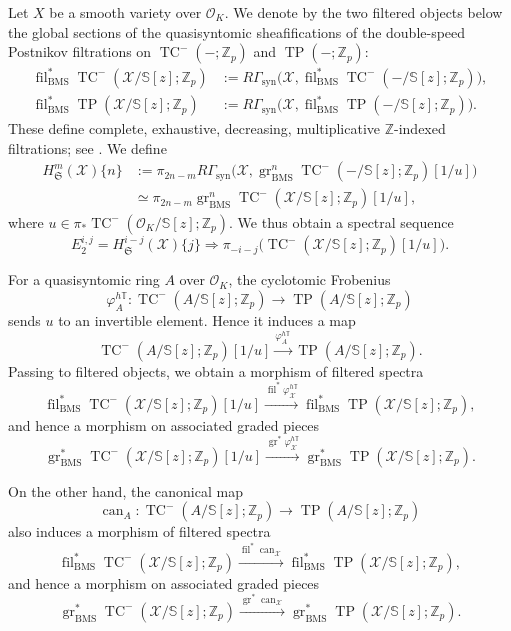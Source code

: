 \documentclass[11pt]{amsart}
\numberwithin{equation}{section}
\newcommand{\Z}{\mathbb{Z}}
\newcommand{\sO}{\mathcal{O}}
\newcommand{\sX}{\mathcal{X}}
\newcommand{\mf}{\mathfrak}
\newcommand{\syn}{{\operatorname{syn}}}
\newcommand{\gr}{{\operatorname{gr}}}
\newcommand{\fil}{{\operatorname{fil}}}
\newcommand{\BMS}{\mathrm{BMS}}
\newcommand{\can}{\operatorname{can}}
\newcommand{\mS}{\mf{S}}
\numberwithin{equation}{section}
\newcommand{\TP}{\operatorname{TP}}
\newcommand{\TCn}{\operatorname{TC}^{-}}
\newcommand{\bS}{\mathbb{S}}
\begin{document}
Let $X$ be a smooth variety over $\sO_K$. We denote by the two filtered objects below the global sections of the quasisyntomic sheafifications of the double-speed Postnikov filtrations on $\TCn(-;\Z_p)$ and $\TP(-;\Z_p)$:
\begin{align*}
\fil_\BMS^*\TCn(\sX/\bS[z];\Z_p)
&:= R\Gamma_{\syn}\bigl(\sX,\fil_\BMS^* \TCn(-/\bS[z];\Z_p)\bigr),\\
\fil_\BMS^*\TP(\sX/\bS[z];\Z_p)
&:= R\Gamma_{\syn}\bigl(\sX,\fil_\BMS^* \TP(-/\bS[z];\Z_p)\bigr).
\end{align*}
These define complete, exhaustive, decreasing, multiplicative $\Z$-indexed filtrations; see \cite[Theorem 1.12]{BMS19}. We define
\begin{align*}
  H^m_{\mS}(\sX)\{n\}
  &:= \pi_{2n-m} R\Gamma_{\syn}\bigl(\sX,\gr_\BMS^{n}\TCn(-/\bS[z];\Z_p)[1/u]\bigr)\\
  &\simeq \pi_{2n-m}\gr_\BMS^{n}\TCn(\sX/\bS[z];\Z_p)[1/u],
\end{align*}
where $u\in \pi_* \TCn(\sO_K/\bS[z];\Z_p)$. We thus obtain a spectral sequence
\begin{equation}\label{bkss}
  E_2^{i,j}=H_{\mS}^{i-j}(\sX)\{j\} \Longrightarrow \pi_{-i-j}\bigl(\TCn(\sX/\bS[z];\Z_p)[1/u]\bigr).
\end{equation}

For a quasisyntomic ring $A$ over $\sO_K$, the cyclotomic Frobenius
\[
  \varphi_A^{h\mathbb{T}}:\TCn(A/\bS[z];\Z_p)\to \TP(A/\bS[z];\Z_p)
\]
sends $u$ to an invertible element. Hence it induces a map
\[
  \TCn(A/\bS[z];\Z_p)[1/u]\overset{\varphi_A^{h\mathbb{T}}}{\longrightarrow}\TP(A/\bS[z];\Z_p).
\]
Passing to filtered objects, we obtain a morphism of filtered spectra
\[
  \fil_{\BMS}^*\TCn(\sX/\bS[z];\Z_p)[1/u]
  \overset{\fil^*\varphi_{\sX}^{h\mathbb{T}}}{\longrightarrow}
  \fil_{\BMS}^*\TP(\sX/\bS[z];\Z_p),
\]
and hence a morphism on associated graded pieces
\[
  \gr_{\BMS}^*\TCn(\sX/\bS[z];\Z_p)[1/u]
  \overset{\gr^*\varphi_{\sX}^{h\mathbb{T}}}{\longrightarrow}
  \gr_{\BMS}^*\TP(\sX/\bS[z];\Z_p).
\]

On the other hand, the canonical map
\[
  \can_A:\TCn(A/\bS[z];\Z_p)\to \TP(A/\bS[z];\Z_p)
\]
also induces a morphism of filtered spectra
\begin{equation}\label{filcan}
  \fil_{\BMS}^*\TCn(\sX/\bS[z];\Z_p)
  \overset{\fil^*\can_{\sX}}{\longrightarrow}
  \fil_{\BMS}^*\TP(\sX/\bS[z];\Z_p),
\end{equation}
and hence a morphism on associated graded pieces
\begin{equation}\label{grcan}
  \gr_{\BMS}^*\TCn(\sX/\bS[z];\Z_p)
  \overset{\gr^*\can_{\sX}}{\longrightarrow}
  \gr_{\BMS}^*\TP(\sX/\bS[z];\Z_p).
\end{equation}
\end{document}

